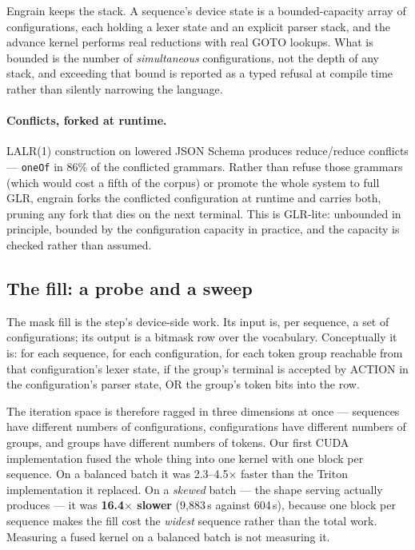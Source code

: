 \documentclass{article}
\begin{document}
Engrain keeps the stack. A sequence's device state is a bounded-capacity array
of configurations, each holding a lexer state and an explicit parser stack, and
the advance kernel performs real reductions with real GOTO lookups. What is
bounded is the number of \emph{simultaneous} configurations, not the depth of
any stack, and exceeding that bound is reported as a typed refusal at compile
time rather than silently narrowing the language.

\paragraph{Conflicts, forked at runtime.} LALR(1) construction on lowered JSON
Schema produces reduce/reduce conflicts --- \texttt{oneOf} in 86\% of the
conflicted grammars. Rather than refuse those grammars (which would cost a fifth
of the corpus) or promote the whole system to full GLR, engrain forks the
conflicted configuration at runtime and carries both, pruning any fork that dies
on the next terminal. This is GLR-lite: unbounded in principle, bounded by the
configuration capacity in practice, and the capacity is checked rather than
assumed.

\subsection{The fill: a probe and a sweep}
\label{sec:fill}

The mask fill is the step's device-side work. Its input is, per sequence, a set
of configurations; its output is a bitmask row over the vocabulary. Conceptually
it is: for each sequence, for each configuration, for each token group reachable
from that configuration's lexer state, if the group's terminal is accepted by
ACTION in the configuration's parser state, OR the group's token bits into the
row.

The iteration space is therefore ragged in three dimensions at once ---
sequences have different numbers of configurations, configurations have
different numbers of groups, and groups have different numbers of tokens. Our
first CUDA implementation fused the whole thing into one kernel with one block
per sequence. On a balanced batch it was 2.3--4.5$\times$ faster than the Triton
implementation it replaced. On a \emph{skewed} batch --- the shape serving
actually produces --- it was \textbf{16.4$\times$ slower} (9{,}883\,\textmu{}s
against 604\,\textmu{}s), because one block per sequence makes the fill cost the
\emph{widest} sequence rather than the total work. Measuring a fused kernel on a
balanced batch is not measuring it.
\end{document}
